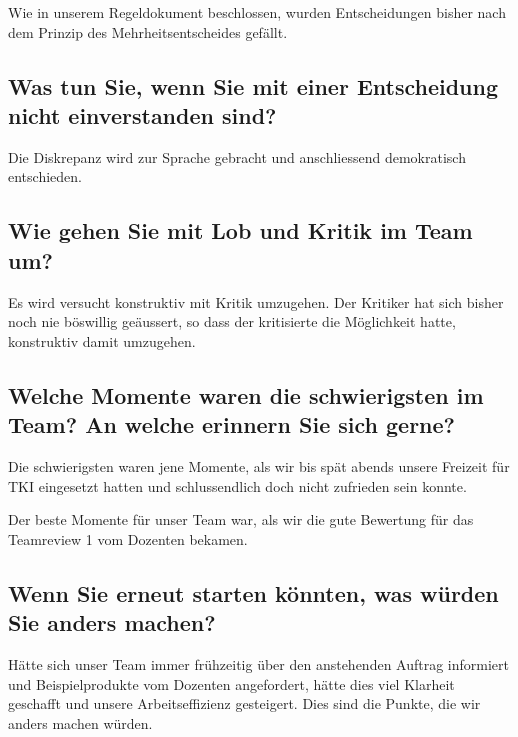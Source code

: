 Wie in unserem Regeldokument beschlossen, wurden Entscheidungen bisher nach dem Prinzip des Mehrheitsentscheides gefällt.

\subsection*{Was tun Sie, wenn Sie mit einer Entscheidung nicht einverstanden sind?}

Die Diskrepanz wird zur Sprache gebracht und anschliessend demokratisch entschieden.

\subsection*{Wie gehen Sie mit Lob und Kritik im Team um?}

Es wird versucht konstruktiv mit Kritik umzugehen. Der Kritiker hat sich bisher noch nie böswillig geäussert, so dass der kritisierte die Möglichkeit hatte, konstruktiv damit umzugehen. 

\subsection*{Welche Momente waren die schwierigsten im Team? An welche erinnern Sie sich
gerne?}

Die schwierigsten waren jene Momente, als wir bis spät abends unsere Freizeit für TKI eingesetzt hatten und schlussendlich doch nicht zufrieden sein konnte. 

Der beste Momente für unser Team war, als wir die gute Bewertung für das Teamreview 1 vom Dozenten bekamen.  

\subsection*{Wenn Sie erneut starten könnten, was würden Sie anders machen?}

Hätte sich unser Team immer frühzeitig über den anstehenden Auftrag informiert und Beispielprodukte vom Dozenten angefordert, hätte dies viel Klarheit geschafft und unsere Arbeitseffizienz gesteigert. Dies sind die Punkte, die wir anders machen würden. 

